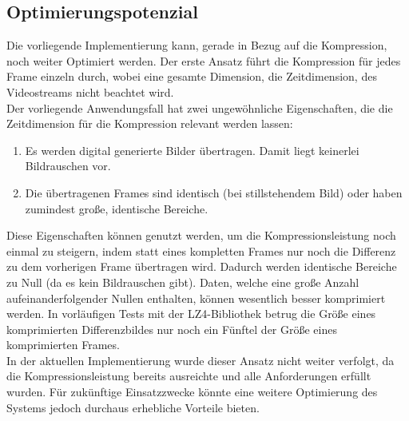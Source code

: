 \subsection{Optimierungspotenzial}
Die vorliegende Implementierung kann, gerade in Bezug auf die Kompression, noch weiter Optimiert werden. Der erste Ansatz führt die Kompression für jedes Frame einzeln durch, wobei eine gesamte Dimension, die Zeitdimension, des Videostreams nicht beachtet wird.\\
Der vorliegende Anwendungsfall hat zwei ungewöhnliche Eigenschaften, die die Zeitdimension für die Kompression relevant werden lassen:
\begin{enumerate}
\item{Es werden digital generierte Bilder übertragen. Damit liegt keinerlei Bildrauschen vor.}
\item{Die übertragenen Frames sind identisch (bei stillstehendem Bild) oder haben zumindest große, identische Bereiche.}
\end{enumerate}

Diese Eigenschaften können genutzt werden, um die Kompressionsleistung noch einmal zu steigern, indem statt eines kompletten Frames nur noch die Differenz zu dem vorherigen Frame übertragen wird. Dadurch werden identische Bereiche zu Null (da es kein Bildrauschen gibt). Daten, welche eine große Anzahl aufeinanderfolgender Nullen enthalten, können wesentlich besser komprimiert werden. In vorläufigen Tests mit der LZ4-Bibliothek betrug die Größe eines komprimierten Differenzbildes nur noch ein Fünftel der Größe eines komprimierten Frames.\\
In der aktuellen Implementierung wurde dieser Ansatz nicht weiter verfolgt, da die Kompressionsleistung bereits ausreichte und alle Anforderungen erfüllt wurden. Für zukünftige Einsatzzwecke könnte eine weitere Optimierung des Systems jedoch durchaus erhebliche Vorteile bieten.


